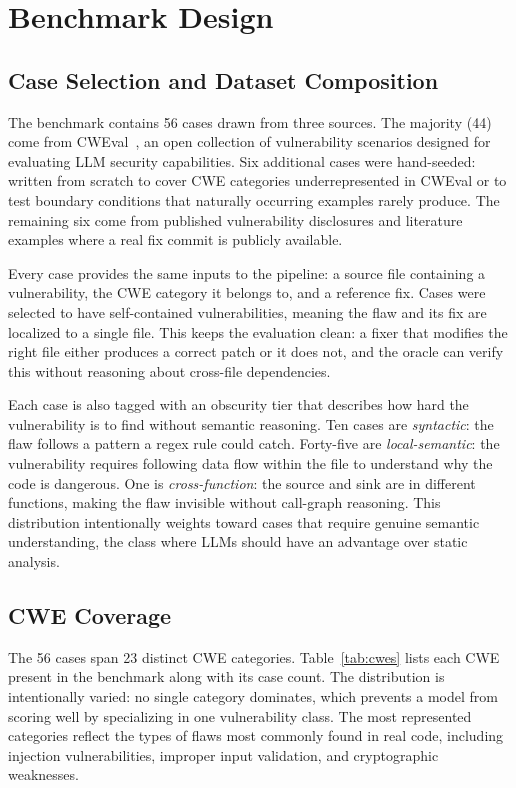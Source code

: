 \documentclass[12pt]{article}
\begin{document}
\section{Benchmark Design}
\label{sec:benchmark}

\subsection{Case Selection and Dataset Composition}

The benchmark contains 56 cases drawn from three sources. The majority (44)
come from CWEval~\cite{cweval}, an open collection of vulnerability scenarios
designed for evaluating LLM security capabilities. Six additional cases were hand-seeded:
written from scratch to cover CWE categories underrepresented in CWEval or
to test boundary conditions that naturally occurring examples rarely produce.
The remaining six come from published vulnerability disclosures and literature
examples where a real fix commit is publicly available.

Every case provides the same inputs to the pipeline: a source file containing
a vulnerability, the CWE category it belongs to, and a reference fix. Cases
were selected to have self-contained vulnerabilities, meaning the flaw and its
fix are localized to a single file. This keeps the evaluation clean: a fixer
that modifies the right file either produces a correct patch or it does not,
and the oracle can verify this without reasoning about cross-file dependencies.

Each case is also tagged with an obscurity tier that describes how hard the
vulnerability is to find without semantic reasoning. Ten cases are
\textit{syntactic}: the flaw follows a pattern a regex rule could catch.
Forty-five are \textit{local-semantic}: the vulnerability requires following
data flow within the file to understand why the code is dangerous. One is
\textit{cross-function}: the source and sink are in different functions,
making the flaw invisible without call-graph reasoning. This distribution
intentionally weights toward cases that require genuine semantic understanding,
the class where LLMs should have an advantage over static analysis.

\subsection{CWE Coverage}

The 56 cases span 23 distinct CWE categories. Table~\ref{tab:cwes} lists each
CWE present in the benchmark along with its case count. The distribution is
intentionally varied: no single category dominates, which prevents a model
from scoring well by specializing in one vulnerability class. The most
represented categories reflect the types of flaws most commonly found in
real code, including injection vulnerabilities, improper input validation,
and cryptographic weaknesses.
\end{document}
